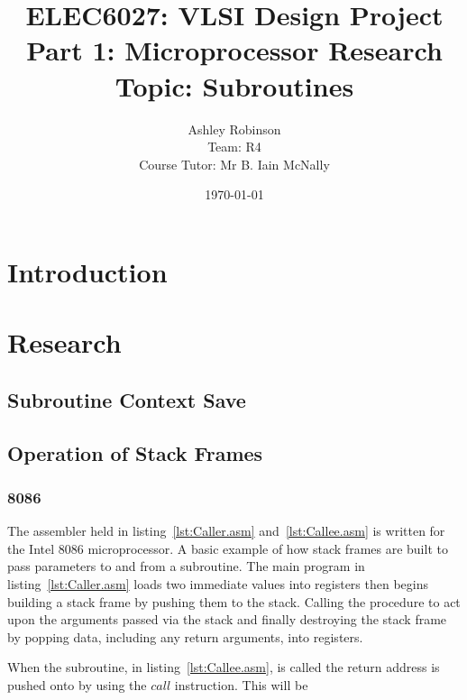 \documentclass[12pt,a4paper]{article}
\title{ELEC6027: VLSI Design Project \\Part 1: Microprocessor Research\\Topic: Subroutines}
\author{Ashley Robinson\\ Team: R4\\Course Tutor: Mr B. Iain McNally}
\date{\today}
\begin{document}
\begin{titlepage}
\maketitle
\end{titlepage}

\tableofcontents
\clearpage

\lstset{
    basicstyle=\footnotesize        %
}


\section{Introduction}


\section{Research}

\subsection{Subroutine Context Save }

\subsection{Operation of Stack Frames}

\subsubsection{8086}
The assembler held in listing~\ref{lst:Caller.asm} and~\ref{lst:Callee.asm} is written for the Intel 8086 microprocessor.
A basic example of how stack frames are built to pass parameters to and from a subroutine.
The main program in listing~\ref{lst:Caller.asm} loads two immediate values into registers then begins building a stack frame by pushing them to the stack.  
Calling the procedure to act upon the arguments passed via the stack and finally destroying the stack frame by popping data, including any return arguments, into registers.



When the subroutine, in listing~\ref{lst:Callee.asm}, is called the return address is pushed onto by using the $call$ instruction.
This will be 

\end{document}
